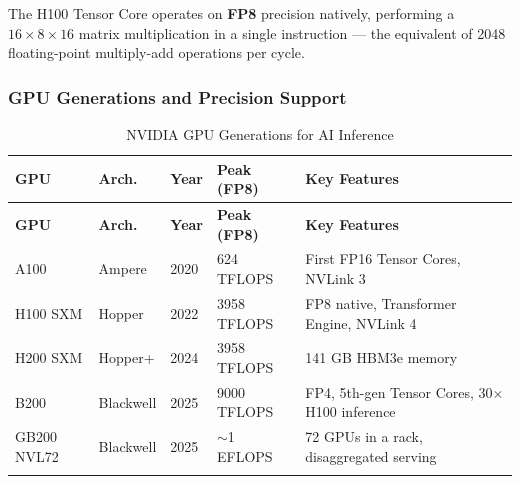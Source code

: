 \documentclass[11pt, twoside, openright]{book}
\begin{document}
\begin{center}
\end{center}

The H100 Tensor Core operates on \textbf{FP8} precision natively, performing a
$16 \times 8 \times 16$ matrix multiplication in a single instruction --- the
equivalent of 2048 floating-point multiply-add operations per cycle.

\subsubsection{GPU Generations and Precision Support}

\begin{longtable}{@{}p{2cm}p{2cm}p{1.5cm}p{1.5cm}p{5cm}@{}}
  \toprule
  \textbf{GPU} & \textbf{Arch.} & \textbf{Year} &
  \textbf{Peak (FP8)} & \textbf{Key Features} \\
  \midrule
  \endfirsthead
  \toprule
  \textbf{GPU} & \textbf{Arch.} & \textbf{Year} &
  \textbf{Peak (FP8)} & \textbf{Key Features} \\
  \midrule
  \endhead
  A100 & Ampere & 2020 & 624 TFLOPS & First FP16 Tensor Cores, NVLink 3 \\
  H100 SXM & Hopper & 2022 & 3958 TFLOPS & FP8 native, Transformer Engine, NVLink 4 \\
  H200 SXM & Hopper+ & 2024 & 3958 TFLOPS & 141 GB HBM3e memory \\
  B200 & Blackwell & 2025 & 9000 TFLOPS & FP4, 5th-gen Tensor Cores, 30$\times$ H100 inference \\
  GB200 NVL72 & Blackwell & 2025 & $\sim$1 EFLOPS & 72 GPUs in a rack, disaggregated serving \\
  \bottomrule
  \caption{NVIDIA GPU Generations for AI Inference}
  \label{tab:gpus}
\end{longtable}
\end{document}
